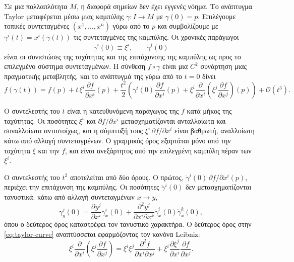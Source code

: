 \documentclass[11pt,a4paper,twoside,openright]{book}
\begin{document}
Σε μια πολλαπλότητα $M$, η διαφορά σημείων δεν έχει εγγενές νόημα. Το ανάπτυγμα Taylor μεταφέρεται μέσω μιας καμπύλης $\gamma: I \to M$ με $\gamma(0) = p$. Επιλέγουμε τοπικές συντεταγμένες $(x^1, \dots, x^n)$ γύρω από το $p$ και συμβολίζουμε με $\gamma^i(t) = x^i(\gamma(t))$ τις συντεταγμένες της καμπύλης. Οι χρονικές παράγωγοι
\begin{equation}
\dot{\gamma}^i(0) \equiv \xi^i, \qquad \ddot{\gamma}^i(0)
\end{equation}
είναι οι συνιστώσες της ταχύτητας και της επιτάχυνσης της καμπύλης ως προς το επιλεγμένο σύστημα συντεταγμένων. Η σύνθεση $f \circ \gamma$ είναι μια $C^2$ συνάρτηση μιας πραγματικής μεταβλητής, και το ανάπτυγμά της γύρω από το $t = 0$ δίνει
\begin{equation}
f(\gamma(t)) = f(p) + t \, \xi^i \frac{\partial f}{\partial x^i}(p) + \frac{t^2}{2} \left( \ddot{\gamma}^i(0) \frac{\partial f}{\partial x^i}(p) + \xi^i \frac{\partial}{\partial x^i}\!\left( \xi^j \frac{\partial f}{\partial x^j} \right)\!(p) \right) + \mathcal{O}(t^3).
\label{eq:taylor-curve}
\end{equation}

Ο συντελεστής του $t$ είναι η κατευθυνόμενη παράγωγος της $f$ κατά μήκος της ταχύτητας. Οι ποσότητες $\xi^i$ και $\partial f / \partial x^i$ μετασχηματίζονται ανταλλοίωτα και συναλλοίωτα αντιστοίχως, και η σύμπτυξή τους $\xi^i \, \partial f / \partial x^i$ είναι βαθμωτή, αναλλοίωτη κάτω από αλλαγή συντεταγμένων. Ο γραμμικός όρος εξαρτάται μόνο από την ταχύτητα $\xi$ και την $f$, και είναι ανεξάρτητος από την επιλεγμένη καμπύλη πέραν των $\xi^i$.

Ο συντελεστής του $t^2$ αποτελείται από δύο όρους. Ο πρώτος, $\ddot{\gamma}^i(0) \, \partial f / \partial x^i(p)$, περιέχει την επιτάχυνση της καμπύλης. Οι ποσότητες $\ddot{\gamma}^i(0)$ δεν μετασχηματίζονται τανυστικά: κάτω από αλλαγή συντεταγμένων $x \to y$,
\begin{equation}
\ddot{\gamma}^j_y(0) = \frac{\partial y^j}{\partial x^i} \ddot{\gamma}^i_x(0) + \frac{\partial^2 y^j}{\partial x^i \partial x^k} \dot{\gamma}^i_x(0) \dot{\gamma}^k_x(0),
\label{eq:acceleration-transformation}
\end{equation}
όπου ο δεύτερος όρος καταστρέφει τον τανυστικό χαρακτήρα. Ο δεύτερος όρος στην \eqref{eq:taylor-curve} αναπτύσσεται εφαρμόζοντας τον κανόνα Leibniz:
\begin{equation}
\xi^i \frac{\partial}{\partial x^i}\!\left( \xi^j \frac{\partial f}{\partial x^j} \right)
= \xi^i \xi^j \frac{\partial^2 f}{\partial x^i \partial x^j} + \xi^i \frac{\partial \xi^j}{\partial x^i} \frac{\partial f}{\partial x^j}.
\label{eq:leibniz-expansion}
\end{equation}
\end{document}
